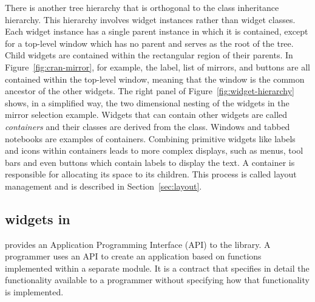 \documentclass[article,shortnames]{jss}
\begin{document}
There is another tree hierarchy that is orthogonal to the class
inheritance hierarchy. This hierarchy involves widget instances rather
than widget classes. Each widget instance has a single parent instance
in which it is contained, except for a top-level window which has no
parent
and serves as the root of the tree. Child widgets are contained within
the rectangular region of their parents.
In Figure~\ref{fig:cran-mirror}, for
example, the label, list of mirrors, and buttons are all contained
within the top-level window, meaning that the window is the common
ancestor of the other widgets.  The right panel of Figure~\ref{fig:widget-hierarchy} shows, in a simplified way, the two
dimensional nesting of the widgets in the mirror selection
example. Widgets that can contain other widgets are called
\emph{containers} and their classes are derived from the
 class. Windows and tabbed notebooks are examples
of containers.  Combining primitive widgets like labels and icons
within containers leads to more complex displays, such as menus,
tool bars and even buttons which contain labels to display the text. A
container is responsible for allocating its space to its
children. This process is called layout management and is described in
Section~\ref{sec:layout}.

\subsection[GTK+ widgets in R]{ widgets in }
 provides an Application Programming Interface (API) to the
library. A programmer uses an API to create an application based on
functions implemented
within a separate module. It is a contract that specifies in detail
the functionality available to a programmer without specifying how
that functionality is implemented. 
 
\end{document}

